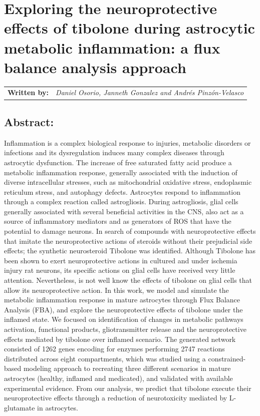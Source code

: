 \chapter{Exploring the neuroprotective effects of tibolone during astrocytic metabolic inflammation: a flux balance analysis approach}
\begin{tabular}{rm{12cm}}
\textsf{\textbf{Written by:}} & \textit{Daniel Osorio, Janneth Gonzalez and Andrés Pinzón-Velasco}\\ 
\end{tabular}
\section*{Abstract:}
Inflammation is a complex biological response to injuries, metabolic disorders or infections and its dysregulation induces many complex diseases through astrocytic dysfunction. The increase of free saturated fatty acid produce a metabolic inflammation response, generally associated with the induction of diverse intracellular stresses, such as mitochondrial oxidative stress, endoplasmic reticulum stress, and autophagy defects.  Astrocytes respond to inflammation through a complex reaction called astrogliosis. During astrogliosis, glial cells generally associated with several beneficial activities in the CNS, also act as a source of inflammatory mediators and as generators of ROS that have the potential to damage neurons. In search of compounds with neuroprotective effects that imitate the neuroprotective actions of steroids without their prejudicial side effects; the synthetic neurosteroid Tibolone was identified. Although Tibolone has been shown to exert neuroprotective actions in cultured and under ischemia injury rat neurons, its specific actions on glial cells have received very little attention. Nevertheless, is not well know the effects of tibolone on glial cells that allow its neuroprotective action. In this work, we model and simulate the metabolic inflammation response in mature astrocytes through Flux Balance Analysis (FBA), and explore the neuroprotective effects of tibolone under the inflamed state. We focused on identification of changes in metabolic pathways activation, functional products, gliotransmitter release and the neuroprotective effects mediated by tibolone over inflamed scenario. The generated network consisted of 1262 genes encoding for enzymes performing 2747 reactions distributed across eight compartments, which was studied using a constrained-based modeling approach to recreating three different scenarios in mature astrocytes (healthy, inflamed and medicated), and validated with available experimental evidence. From our analysis, we predict that tibolone execute their neuroprotective effects through a reduction of neurotoxicity mediated by L-glutamate in astrocytes.
